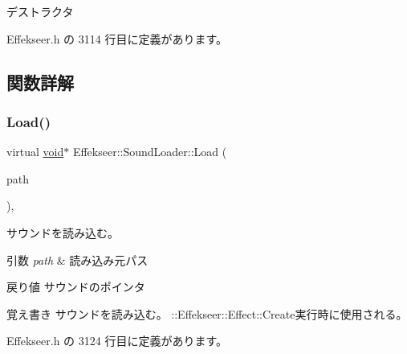 デストラクタ 



 Effekseer.\+h の 3114 行目に定義があります。



\subsection{関数詳解}
\mbox{\label{class_effekseer_1_1_sound_loader_a871ad4843c0dee971d897a654643bdef}} 
\subsubsection{\texorpdfstring{Load()}{Load()}}
{\footnotesize\ttfamily virtual \mbox{\hyperlink{namespace_effekseer_ab34c4088e512200cf4c2716f168deb56}{void}}$\ast$ Effekseer\+::\+Sound\+Loader\+::\+Load (\begin{DoxyParamCaption}\item[{const \mbox{\hyperlink{_effekseer_8h_a50b026abea014b47854bcd835b3b6233}{E\+F\+K\+\_\+\+C\+H\+AR}} $\ast$}]{path }\end{DoxyParamCaption})\hspace{0.3cm}{\ttfamily [inline]}, {\ttfamily [virtual]}}



サウンドを読み込む。 


\begin{DoxyParams}{引数}
{\em path} & 読み込み元パス \\
\hline
\end{DoxyParams}
\begin{DoxyReturn}{戻り値}
サウンドのポインタ 
\end{DoxyReturn}
\begin{DoxyNote}{覚え書き}
サウンドを読み込む。 \+::\+Effekseer\+::\+Effect\+::\+Create実行時に使用される。 
\end{DoxyNote}


 Effekseer.\+h の 3124 行目に定義があります。

\mbox{\label{class_effekseer_1_1_sound_loader_aa0b0fda4cbd0f9a6b9bf1babaef93679}} 

